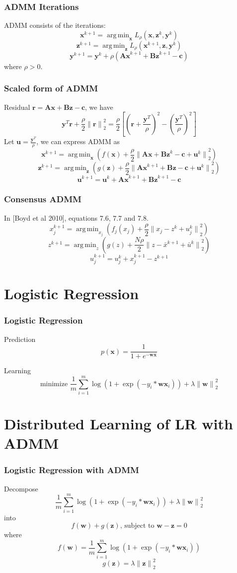 \documentclass{beamer}
\DeclareMathOperator*{\argmin}{arg\,min}
\begin{document}
\begin{frame}
\frametitle{ADMM Iterations}

ADMM consists of the iterations:
$$\mathbf{x}^{k+1} = \argmin_\mathbf{x} L_\rho (\mathbf{x},\mathbf{z}^k,\mathbf{y}^k)$$
$$\mathbf{z}^{k+1} = \argmin_\mathbf{z} L_\rho (\mathbf{x}^{k+1},\mathbf{z},\mathbf{y}^k)$$
$$\mathbf{y}^{k+1} = \mathbf{y}^k + \rho (\mathbf{Ax}^{k+1}+\mathbf{Bz}^{k+1}-\mathbf{c})$$
where $\rho > 0$.
\end{frame}

\begin{frame}
\frametitle{Scaled form of ADMM}
Residual $\mathbf{r} = \mathbf{Ax}+\mathbf{Bz}-\mathbf{c}$, we have
$$\mathbf{y}^T \mathbf{r} + \frac{\rho}{2} {\|\mathbf{r}\|}_2^2 = \frac{\rho}{2} [(\mathbf{r} + \frac{\mathbf{y}^T}{\rho})^2 - (\frac{\mathbf{y}^T}{\rho})^2]$$
Let $\mathbf{u} = \frac{\mathbf{y}^T}{\rho}$, we can express ADMM as
$$\mathbf{x}^{k+1} = \argmin_\mathbf{x} (f(\mathbf{x}) + \frac{\rho}{2} {\|\mathbf{Ax}+\mathbf{Bz}^k-\mathbf{c}+\mathbf{u}^k\|}_2^2) $$
$$\mathbf{z}^{k+1} = \argmin_\mathbf{z} (g(\mathbf{z}) + \frac{\rho}{2} {\|\mathbf{Ax}^{k+1}+\mathbf{Bz}-\mathbf{c}+\mathbf{u}^k\|}_2^2) $$
$$\mathbf{u}^{k+1} = \mathbf{u}^k + \mathbf{Ax}^{k+1}+\mathbf{Bz}^{k+1}-\mathbf{c}$$
\end{frame}

\begin{frame}
\frametitle{Consensus ADMM}
In [Boyd et al 2010], equations 7.6, 7.7 and 7.8.
$$x_j^{k+1} = \argmin_{x_j} (f_j(x_j) + \frac{\rho}{2} {\|x_j - z^k + u_j^k\|}_2^2)$$
$$z^{k+1} = \argmin_z (g(z) + \frac{N\rho}{2} {\|z - \bar{x}^{k+1} + \bar{u}^k\|}_2^2)$$
$$u_j^{k+1} = u_j^k + x_j^{k+1} - z^{k+1}$$
\end{frame}

\section{Logistic Regression}
\begin{frame}
\frametitle{Logistic Regression}
\begin{block}{Prediction}
$$p(\mathbf{x}) = \frac{1}{1 + e^{-\mathbf{wx}}}$$
\end{block}
\begin{block}{Learning}
$$\text{minimize } \frac{1}{m} \sum_{i=1}^{m} \log(1+\exp(-y_i* \mathbf{w} \mathbf{x}_i)) + \lambda{\|\mathbf{w}\|}_2^2$$
\end{block}
\end{frame}

\section{Distributed Learning of LR with ADMM}
\begin{frame}
\frametitle{Logistic Regression with ADMM}
Decompose 
$$\frac{1}{m} \sum_{i=1}^{m} \log(1+\exp(-y_i* \mathbf{w} \mathbf{x}_i)) + \lambda{\|\mathbf{w}\|}_2^2$$
into
$$f(\mathbf{w}) + g(\mathbf{z})\text{, subject to } \mathbf{w} - \mathbf{z} = 0$$
where
$$f(\mathbf{w}) = \frac{1}{m} \sum_{i=1}^{m} \log(1+\exp(-y_i* \mathbf{w} \mathbf{x}_i))$$
$$g(\mathbf{z}) = \lambda{\|\mathbf{z}\|}_2^2$$
\end{frame}
\end{document}

